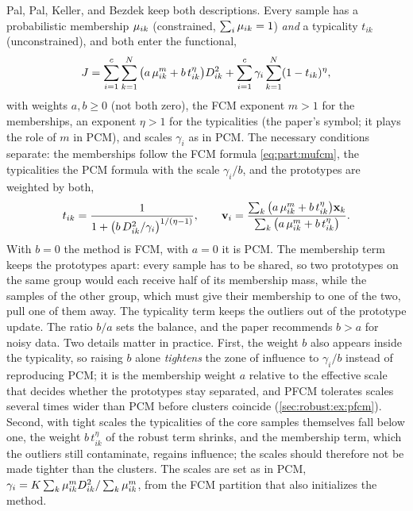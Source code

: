 Pal, Pal, Keller, and Bezdek \cite{pal:2005:pfcm} keep both descriptions. Every sample has a probabilistic membership $\mu_{ik}$ (constrained, $\sum_i\mu_{ik}=1$) \emph{and} a typicality $t_{ik}$ (unconstrained), and both enter the functional,
\begin{equation}
  J=\sum_{i=1}^{c}\sum_{k=1}^{N}\big(a\,\mu_{ik}^m+b\,t_{ik}^{\eta}\big)D^2_{ik}+\sum_{i=1}^{c}\gamma_i\sum_{k=1}^{N}(1-t_{ik})^{\eta},
  \label{eq:robust:Jpfcm}
\end{equation}
with weights $a,b\ge0$ (not both zero), the FCM exponent $m>1$ for the memberships, an exponent $\eta>1$ for the typicalities (the paper's symbol; it plays the role of $m$ in PCM), and scales $\gamma_i$ as in PCM. The necessary conditions separate: the memberships follow the FCM formula \eqref{eq:part:mufcm}, the typicalities the PCM formula with the scale $\gamma_i/b$, and the prototypes are weighted by both,
\begin{equation}
  t_{ik}=\frac{1}{1+\big(b\,D^2_{ik}/\gamma_i\big)^{1/(\eta-1)}},\qquad
  \mathbf{v}_i=\frac{\sum_k\big(a\,\mu_{ik}^m+b\,t_{ik}^{\eta}\big)\mathbf{x}_k}{\sum_k\big(a\,\mu_{ik}^m+b\,t_{ik}^{\eta}\big)}.
  \label{eq:robust:pfcm}
\end{equation}
With $b=0$ the method is FCM, with $a=0$ it is PCM. The membership term keeps the prototypes apart: every sample has to be shared, so two prototypes on the same group would each receive half of its membership mass, while the samples of the other group, which must give their membership to one of the two, pull one of them away. The typicality term keeps the outliers out of the prototype update. The ratio $b/a$ sets the balance, and the paper recommends $b>a$ for noisy data. Two details matter in practice. First, the weight $b$ also appears inside the typicality, so raising $b$ alone \emph{tightens} the zone of influence to $\gamma_i/b$ instead of reproducing PCM; it is the membership weight $a$ relative to the effective scale that decides whether the prototypes stay separated, and PFCM tolerates scales several times wider than PCM before clusters coincide (\cref{sec:robust:ex:pfcm}). Second, with tight scales the typicalities of the core samples themselves fall below one, the weight $b\,t_{ik}^\eta$ of the robust term shrinks, and the membership term, which the outliers still contaminate, regains influence; the scales should therefore not be made tighter than the clusters. The scales are set as in PCM, $\gamma_i=K\sum_k\mu_{ik}^mD^2_{ik}/\sum_k\mu_{ik}^m$, from the FCM partition that also initializes the method.

